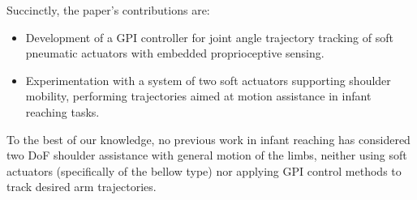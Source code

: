 \documentclass[letterpaper, 10pt, conference]{ieeeconf}      %
\def\kkr{\textcolor{red}}
\begin{document}
   
%
%

Succinctly, the paper's contributions are: 
\begin{itemize}
    \item Development of a GPI controller for joint angle trajectory tracking of soft pneumatic actuators with embedded proprioceptive sensing.
    \item Experimentation with a system of two soft actuators supporting shoulder mobility, performing trajectories aimed at motion assistance in infant reaching tasks.
\end{itemize}

To the best of our knowledge, no previous work in infant reaching has considered two DoF shoulder assistance with general motion of the limbs, neither using soft actuators (specifically of the bellow type) nor applying GPI control methods to track desired arm trajectories. 
\end{document}

